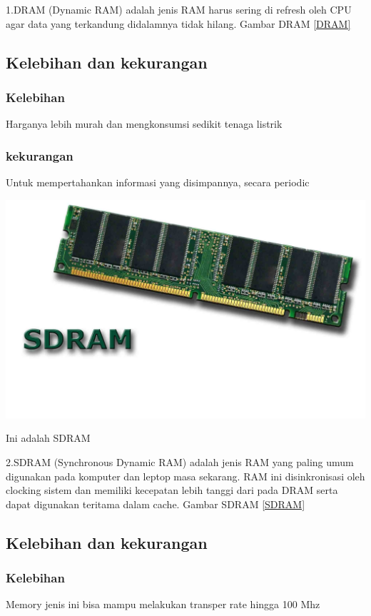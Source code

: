 1.DRAM (Dynamic RAM) adalah jenis RAM harus sering di refresh oleh CPU agar data yang terkandung didalamnya tidak hilang.
  Gambar DRAM \ref{DRAM}
  \subsection{Kelebihan dan kekurangan}
    \subsubsection{Kelebihan}
    \-Harganya lebih murah dan mengkonsumsi sedikit tenaga listrik
    \subsubsection{kekurangan}
    \-Untuk mempertahankan informasi yang disimpannya, secara periodic
    
  \begin{figures}[ht]
  \centerline{\includegraphics[width=1\textwidth]{figures/SDRAM.jpg}}
  \caption{Ini adalah SDRAM}
  \label{SDRAM}
  \end{figures}

2.SDRAM (Synchronous Dynamic RAM) adalah jenis RAM yang paling umum digunakan pada komputer dan leptop masa sekarang. RAM ini disinkronisasi oleh clocking sistem dan memiliki kecepatan lebih tanggi dari pada DRAM serta dapat digunakan teritama dalam cache.
Gambar SDRAM \ref{SDRAM}
    \subsection{Kelebihan dan kekurangan}
    \subsubsection{Kelebihan}
    \-Memory jenis ini bisa mampu melakukan transper rate hingga 100 Mhz
